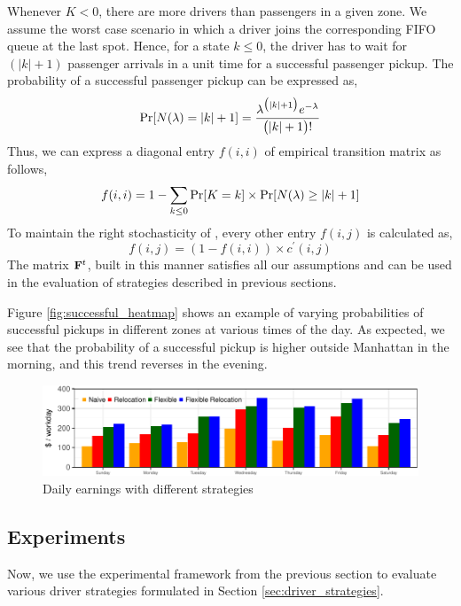 Whenever %
$K<0$, there are more drivers than passengers in a given zone. We assume the worst case scenario in which a driver joins the corresponding FIFO queue at the last spot. Hence, for a state $k \leq 0$, the driver has to wait for $(|k| + 1)$ passenger arrivals in a unit time for a successful passenger pickup. The probability of a successful passenger pickup can be expressed as,
\begin{equation}
\Pr[N(\lambda) = |k| + 1] = \frac{\lambda^{\big(|k|+1\big)} e^{-\lambda}}{\big(|k| + 1\big)!}
\end{equation}
Thus, we can express a diagonal entry $f(i,i)$ of empirical transition matrix as follows,
\begin{equation}
f(i,i) = 1 - \sum_{k \leq 0} \Pr[K = k] \times \Pr[N(\lambda) \geq |k| + 1]
\end{equation}
To maintain the right stochasticity of {\empiricaltransitionmatrix}, every other entry $f(i,j)$ is calculated as,
\begin{equation}
f(i,j) = (1 - f(i,i)) \times c^\prime(i,j)
\end{equation}
The matrix ${\mathbf{F}}^t$, built in this manner satisfies all our assumptions and can be used in the evaluation of strategies described in previous sections. 

Figure \ref{fig:successful_heatmap} shows an example of varying probabilities of successful pickups in different zones at various times of the day. As expected, we see that the probability of a successful pickup is higher outside Manhattan in the morning, and this trend reverses in the evening.

\begin{figure}
	\centering
	\includegraphics{figures/daily_earnings.pdf}
	\caption{Daily earnings with different strategies}
	\label{fig:daily_earnings}
\end{figure}

\subsection{Experiments}
Now, we use the experimental framework from the previous section to evaluate various driver strategies formulated in Section \ref{sec:driver_strategies}.

